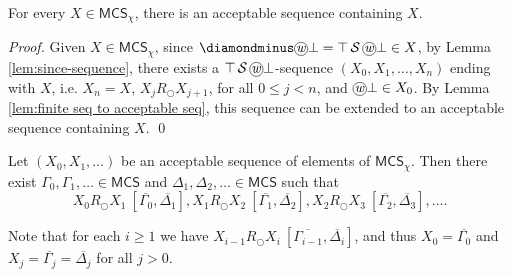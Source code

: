 \documentclass[envcountsect,envcountsame,oribibl,orivec]{llncs}
\newcommand*\circled[1]{\tikz[baseline=(char.base)]{
		\node[shape=circle,draw,inner sep=0.4pt] (char) {#1};}}
\newcommand{\lnext}{\bigcirc}
\newcommand{\lonce}{\diamondminus}
\newcommand{\lsince}{{\,\mathcal{S}\,}}
\newcommand{\wprevious}{\circled{\textit{w}}}
\newcommand{\MCS}{\mathsf{MCS}}
\newcommand{\RO}[4]{#1 R_\lnext #2\ [#3, #4]}
\begin{document}
\begin{corollary}\label{cor:acceptable sequence starts with Gamma}
	For every $X \in \MCS_\chi$, there is an acceptable sequence containing $X$. 
\end{corollary}
\begin{proof}
	Given $X \in \MCS_\chi$, since $\lonce \wprevious \bot = \top \lsince \wprevious \bot \in X$, by Lemma \ref{lem:since-sequence}, there exists a $\top \lsince \wprevious \bot$-sequence  $(X_0, X_1, \ldots, X_n)$ ending with $X$, i.e. $X_n = X$, $X_j R_\lnext X_{j+1}$, for all $0 \leq j < n$, and $\wprevious \bot \in X_0$. By Lemma \ref{lem:finite seq to acceptable seq}, this sequence can be extended to an acceptable sequence containing $X$.  \qed 
\end{proof}

Let $(X_0, X_1, \ldots)$ be an acceptable sequence of elements of $\MCS_\chi$. Then there exist $\Gamma_{0}, \Gamma_{1}, \ldots \in \MCS$ and $\Delta_{1}, \Delta_{2}, \ldots \in \MCS$ such that
%
$$\RO{X_{0}}{X_{1}}{\overline{\Gamma_{0}}}{\overline{\Delta_{1}}}, \RO{X_{1}}{X_{2}}{\overline{\Gamma_{1}}}{\overline{\Delta_{2}}},\RO{X_{2}}{X_{3}}{\overline{\Gamma_{2}}}{\overline{\Delta_{3}}}, \ldots.$$

Note that for each $i \geq 1$ we have $\RO{X_{i-1}}{X_{i}}{\overline{\Gamma_{i-1}}}{\overline{\Delta_{i}}}$, and thus $X_0 = \overline{\Gamma_{0}}$ and $X_j = \overline{\Gamma_{j}} = \overline{\Delta_{j}}$ for all $j > 0$.
\end{document}
